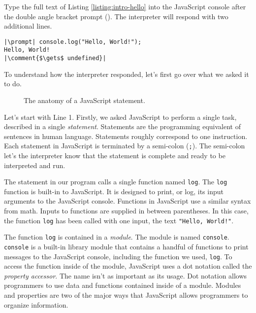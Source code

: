 Type the full text of Listing \ref{listing:intro-hello} into the JavaScript console after the double angle bracket prompt (\prompt). The interpreter will respond with two additional lines.

\reactivatelinenumbers
\begin{lstlisting}[caption={\label{listing:intro-console} A session in the JavaScript console of a web browser.}, escapeinside=||]
|\prompt| console.log("Hello, World!");
Hello, World!
|\comment{$\gets$ undefined}|
\end{lstlisting}

To understand how the interpreter responded, let's first go over what we asked it to do.

\begin{figure}[h]
  
  \caption{The anatomy of a JavaScript statement.}
\end{figure}

Let's start with Line 1. Firstly, we asked JavaScript to perform a single task, described in a single \emph{statement}. Statements are the programming equivalent of sentences in human language. Statements roughly correspond to one instruction. Each statement in JavaScript is terminated by a semi-colon (\texttt{;}). The semi-colon let's the interpreter know that the statement is complete and ready to be interpreted and run.

The statement in our program calls a single function named \texttt{log}. The \texttt{log} function is built-in to JavaScript. It is designed to print, or log, its input arguments to the JavaScript console. Functions in JavaScript use a similar syntax from math. Inputs to functions are supplied in between parentheses. In this case, the function \texttt{log} has been called with one input, the text \texttt{"Hello, World!"}.

The function \texttt{log} is contained in a \emph{module}. The module is named \texttt{console}. \texttt{console} is a built-in library module that contains a handful of functions to print messages to the JavaScript console, including the function we used, \texttt{log}. To access the function inside of the module, JavaScript uses a dot notation called the \emph{property accessor}. The name isn't as important as its usage.  Dot notation allows programmers to use data and functions contained inside of a module. Modules and properties are two of the major ways that JavaScript allows programmers to organize information.

